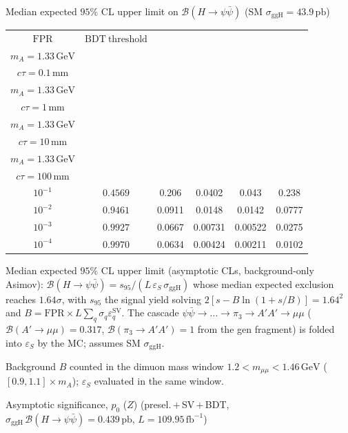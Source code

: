 \documentclass[10pt,a4paper]{article}
\begin{document}
{\vspace{12pt}

Median expected $95\%$ CL upper limit on $\mathcal{B}(H\to\psi\bar{\psi})$ (SM $\sigma_{\mathrm{ggH}}=43.9\,\mathrm{pb}$)

\begin{tabular}{cccccc}
\toprule
$\mathrm{FPR}$ & $\mathrm{BDT\ threshold}$ & \shortstack{$m_{\pi}=4\,\mathrm{GeV}$\\$m_{A}=1.33\,\mathrm{GeV}$\\$c\tau=0.1\,\mathrm{mm}$} & \shortstack{$m_{\pi}=4\,\mathrm{GeV}$\\$m_{A}=1.33\,\mathrm{GeV}$\\$c\tau=1\,\mathrm{mm}$} & \shortstack{$m_{\pi}=4\,\mathrm{GeV}$\\$m_{A}=1.33\,\mathrm{GeV}$\\$c\tau=10\,\mathrm{mm}$} & \shortstack{$m_{\pi}=4\,\mathrm{GeV}$\\$m_{A}=1.33\,\mathrm{GeV}$\\$c\tau=100\,\mathrm{mm}$} \\
\midrule
$10^{-1}$ & $0.4569$ & 0.206 & 0.0402 & 0.043 & 0.238\\
$10^{-2}$ & $0.9461$ & 0.0911 & 0.0148 & 0.0142 & 0.0777\\
$10^{-3}$ & $0.9927$ & 0.0667 & 0.00731 & 0.00522 & 0.0275\\
$10^{-4}$ & $0.9970$ & 0.0634 & 0.00424 & 0.00211 & 0.0102\\
\bottomrule
\end{tabular}

{\small Median expected $95\%$ CL upper limit (asymptotic CLs, background-only Asimov): $\mathcal{B}(H\to\psi\bar{\psi})=s_{95}/(L\,\varepsilon_S\,\sigma_{\mathrm{ggH}})$ whose median expected exclusion reaches $1.64\sigma$, with $s_{95}$ the signal yield solving $2[s-B\ln(1{+}s/B)]=1.64^2$ and $B=\mathrm{FPR}\times L\sum_q\sigma_q\varepsilon_q^{\mathrm{SV}}$. The cascade $\psi\bar{\psi}\to\ldots\to\pi_3\to A'A'\to\mu\mu$ ($\mathcal{B}(A'\to\mu\mu)=0.317$, $\mathcal{B}(\pi_3\to A'A')=1$ from the gen fragment) is folded into $\varepsilon_S$ by the MC; assumes SM $\sigma_{\mathrm{ggH}}$.}

{\small Background $B$ counted in the dimuon mass window $1.2<m_{\mu\mu}<1.46\,\mathrm{GeV}$ ($[0.9,1.1]\times m_A$); $\varepsilon_S$ evaluated in the same window.}

\vspace{12pt}

Asymptotic significance, $p_0$ ($Z$) (presel.\,$+$\,SV\,$+$\,BDT, $\sigma_{\mathrm{ggH}}\,\mathcal{B}(H\to\psi\bar{\psi})=0.439\,\mathrm{pb}$, $L=109.95\,\mathrm{fb}^{-1}$)

}
\end{document}
